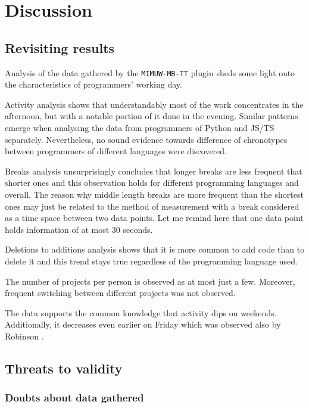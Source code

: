 \chapter{Discussion}\label{ch:discussion}

\section{Revisiting results}

Analysis of the data gathered by the \texttt{MIMUW-MB-TT} plugin sheds some light onto the characteristics of programmers' working day.

Activity analysis shows that understandably most of the work concentrates in the afternoon, but with a notable portion of it done in the evening. Similar patterns emerge when analysing the data from programmers of Python and JS/TS separately. Nevertheless, no sound evidence towards difference of chronotypes between programmers of different languages were discovered.

Breaks analysis unsurprisingly concludes that longer breaks are less frequent that shorter ones and this observation holds for different programming languages and overall. The reason why middle length breaks are more frequent than the shortest ones may just be related to the method of measurement with a break considered as a time space between two data points. Let me remind here that one data point holds information of at most 30 seconds.

Deletions to additions analysis shows that it is more common to add code than to delete it and this trend stays true regardless of the programming language used.

The number of projects per person is observed as at most just a few. Moreover, frequent switching between different projects was not observed.

The data supports the common knowledge that activity dips on weekends. Additionally, it decreases even earlier on Friday which was observed also by Robinson \cite{Rob17LangsUsedAtNight}.

\section{Threats to validity}

\subsection{Doubts about data gathered}


